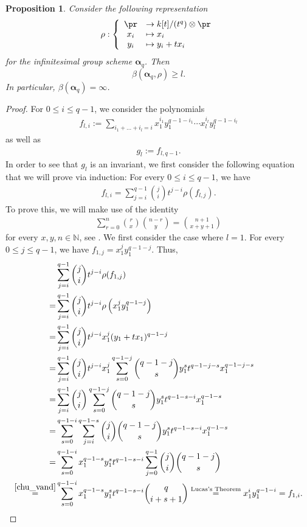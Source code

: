 \documentclass[reqno]{amsart}
\newcommand{\NN}{{\mathbb{N}}}
\newcommand{\balpha}{\boldsymbol{\alpha}}
\theoremstyle{definition}
\theoremstyle{plain}
\newtheorem{Proposition}[Definition]{Proposition}
\begin{document}
\begin{Proposition} \label{pAlpha}%
  Consider the following representation
  \begin{align*}
	\rho:
	\left\{ 
	\begin{array} {cl}
		\pr &\to k[t]/(t^q) \otimes \pr\\
		x_i &\mapsto x_i \\
		y_i &\mapsto y_i + tx_i
	\end{array}
	\right.
  \end{align*}
  for the infinitesimal group scheme $\balpha_q$. Then
  \[
    \beta(\balpha_q,\rho) \ge l.
  \]
  In particular, $\beta(\balpha_q) = \infty$.
\end{Proposition}

\begin{proof}
For $0 \leq i \leq q-1$, we consider the polynomials
\begin{align*}
	f_{l,i} := \sum_{i_1 + \dots + i_l= i} 
	x_1^{i_1}y_1^{q-1-i_1} \cdots x_l^{i_l}y_l^{q-1-i_l} 
\end{align*}
as well as
\begin{align*}
	g_{l} := f_{l,q-1}.
\end{align*}
In order to see that $g_l$ is an invariant, we first consider the following equation that we will prove via induction:
For every $0 \leq i \leq q-1$, we have
\begin{align}
f_{l,i} = \sum_{j=i}^{q-1} 
\binom{j}{i} t^{j-i}  \rho(f_{l, j}). \label{lem_alpha_q}
\end{align}
To prove this, we will make use of the identity
 \begin{align}
	\sum_{r=0}^{n} \binom{r}{{x}}\binom{n-r}{y} = \binom{n+1}{x+y+1} \label{chu_vand}
\end{align}
for every $x,y,n \in \NN$, see \cite[Proposition 3.32(f)]{Grinberg}. 
We first consider the case where $l = 1$. For every $0 \leq j \leq q-1$, we have $f_{1,j} = x_1^j y_1^{q-1-j}$. Thus,
\begin{align*}
	&\sum_{j=i}^{q-1} 
	\binom{j}{i} t^{j-i}  \rho(f_{1, j})\\
    = &\sum_{j=i}^{q-1} 
	\binom{j}{i} t^{j-i}  \rho \left( x_1^j y_1^{q-1-j} \right)
    \\
	= &\sum_{j=i}^{q-1} 
	\binom{j}{i} t^{j-i}  x_1^j (y_1+ tx_1)^{q-1-j}  \\
	= & \sum_{j=i}^{q-1} 
	\binom{j}{i} t^{j-i}  x_1^j 
	\sum_{s=0}^{q-1-j} \binom{q-1-j}{s} y_1^s t^{q-1-j-s}x_1^{q-1-j-s}
    \\
	= & \sum_{j=i}^{q-1} 
	\binom{j}{i}
		\sum_{s=0}^{q-1-j}
		\binom{q-1-j}{s} y_1^s t^{q-1-s-i}x_1^{q-1-s}
	 \\
    = & 
	\sum_{s=0}^{q-1-i} 
	\sum_{\substack{j=i }}^{q-1-s} 
	\binom{j}{i}
	\binom{q-1-j}{s} y_1^s t^{q-1-s-i}x_1^{q-1-s}\\
	= & 
	\sum_{s=0}^{q-1-i} 
	x_1^{q-1-s} y_1^st^{q-1-s-i}
	\sum_{j=0}^{q-1} 
		\binom{j}{i}
		\binom{q-1-j}{s} \\
	\overset{\cref{chu_vand}}{=} & 
	\sum_{s=0}^{q-1-i} 
	x_1^{q-1-s} y_1^s t^{q-1-s-i}
	\binom{q}{i+s+1}
	\overset{\text{Lucas's Theorem}}{=}  x_1^i y_1^{q-1-i} 
	=  f_{1,i}.
\end{align*}


\end{proof}
\end{document}
